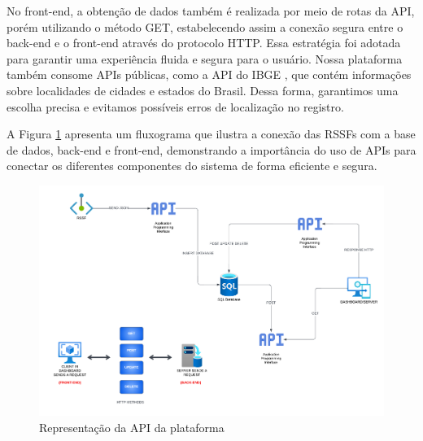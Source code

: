 \documentclass[tcc,capa]{texufpel}
\begin{document}
No front-end, a obtenção de dados também é realizada por meio de rotas da API, porém utilizando o método GET, estabelecendo assim a conexão segura entre o back-end e o front-end através do protocolo HTTP. Essa estratégia foi adotada para garantir uma experiência fluida e segura para o usuário. Nossa plataforma também consome APIs públicas, como a API do IBGE \cite{IBGE:2022}, que contém informações sobre localidades de cidades e estados do Brasil. Dessa forma, garantimos uma escolha precisa e evitamos possíveis erros de localização no registro.

A Figura \ref{apinos} apresenta um fluxograma que ilustra a conexão das RSSFs com a base de dados, back-end e front-end, demonstrando a importância do uso de APIs para conectar os diferentes componentes do sistema de forma eficiente e segura.

\begin{figure}[htbp]
\centering \includegraphics[scale=.4]{assets/apinos.png}
\caption{Representação da API da plataforma}
\label{apinos}
\end{figure}
\end{document}
